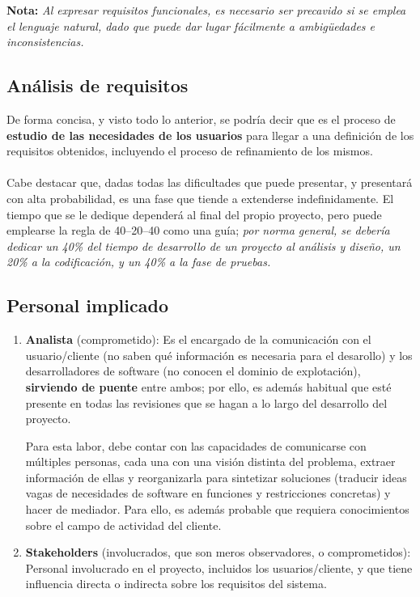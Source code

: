 \textbf{Nota:} \textit{Al expresar requisitos funcionales, es necesario ser precavido si se emplea el lenguaje natural, dado que puede dar lugar fácilmente a ambigüedades e inconsistencias.}

\subsection{Análisis de requisitos}

De forma concisa, y visto todo lo anterior, se podría decir que es el proceso de \textbf{estudio de las necesidades de los usuarios} para llegar a una definición de los requisitos obtenidos, incluyendo el proceso de refinamiento de los mismos.
\\\\
Cabe destacar que, dadas todas las dificultades que puede presentar, y presentará con alta probabilidad, es una fase que tiende a extenderse indefinidamente. El tiempo que se le dedique dependerá al final del propio proyecto, pero puede emplearse la regla de 40--20--40 como una guía; \textit{por norma general, se debería dedicar un 40\% del tiempo de desarrollo de un proyecto al análisis y diseño, un 20\% a la codificación, y un 40\% a la fase de pruebas.}

\subsection{Personal implicado}

\begin{enumerate}
    \item \textbf{Analista} (comprometido): Es el encargado de la comunicación con el usuario/cliente (no saben qué información es necesaria para el desarollo) y los desarrolladores de software (no conocen el dominio de explotación), \textbf{sirviendo de puente} entre ambos; por ello, es además habitual que esté presente en todas las revisiones que se hagan a lo largo del desarrollo del proyecto.
    
    Para esta labor, debe contar con las capacidades de comunicarse con múltiples personas, cada una con una visión distinta del problema, extraer información de ellas y reorganizarla para sintetizar soluciones (traducir ideas vagas de necesidades de software en funciones y restricciones concretas) y hacer de mediador. Para ello, es además probable que requiera conocimientos sobre el campo de actividad del cliente.

    \item \textbf{Stakeholders} (involucrados, que son meros observadores, o comprometidos): Personal involucrado en el proyecto, incluidos los usuarios/cliente, y que tiene influencia directa o indirecta sobre los requisitos del sistema.
\end{enumerate}


